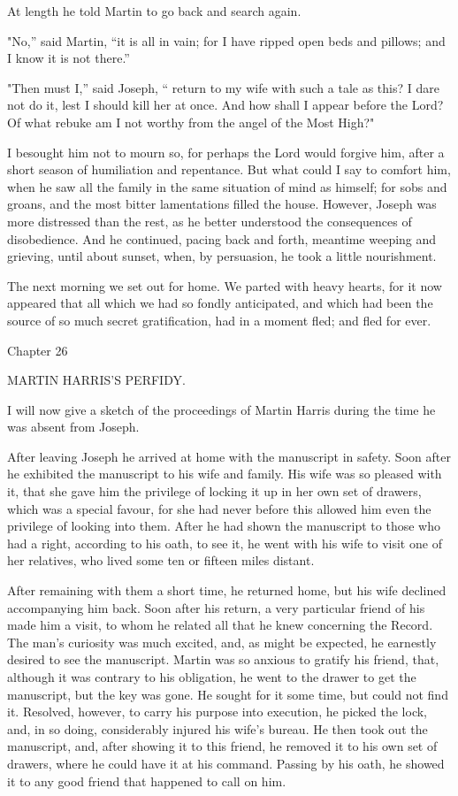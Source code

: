 		At length he told Martin to go back and search again.

		"No,'' said Martin, ``it is all in vain; for I have ripped open beds and pillows; and I know it is not there.''

		"Then must I,'' said Joseph, `` return to my wife with such a tale as this? I dare not do it, lest I should kill her at once. And how shall I appear before the Lord? Of what rebuke am I not worthy from the angel of the Most High?"

		I besought him not to mourn so, for perhaps the Lord would forgive him, after a short season of humiliation and repentance. But what could I say to comfort him, when he saw all the family in the same situation of mind as himself; for sobs and groans, and the most bitter lamentations filled the house. However, Joseph was more distressed than the rest, as he better understood the consequences of disobedience. And he continued, pacing back and forth, meantime weeping and grieving, until about sunset, when, by persuasion, he took a little nourishment.

		The next morning we set out for home. We parted with heavy hearts, for it now appeared that all which we had so fondly anticipated, and which had been the source of so much secret gratification, had in a moment fled; and fled for ever.
		
		Chapter 26

		MARTIN HARRIS'S PERFIDY.

		I will now give a sketch of the proceedings of Martin Harris during the time he was absent from Joseph.

		After leaving Joseph he arrived at home with the manuscript in safety. Soon after he exhibited the manuscript to his wife and family. His wife was so pleased with it, that she gave him the privilege of locking it up in her own set of drawers, which was a special favour, for she had never before this allowed him even the privilege of looking into them. After he had shown the manuscript to those who had a right, according to his oath, to see it, he went with his wife to visit one of her relatives, who lived some ten or fifteen miles distant.

		After remaining with them a short time, he returned home, but his wife declined accompanying him back. Soon after his return, a very particular friend of his made him a visit, to whom he related all that he knew concerning the Record. The man's curiosity was much excited, and, as might be expected, he earnestly desired to see the manuscript. Martin was so anxious to gratify his friend, that, although it was contrary to his obligation, he went to the drawer to get the manuscript, but the key was gone. He sought for it some time, but could not find it. Resolved, however, to carry his purpose into execution, he picked the lock, and, in so doing, considerably injured his wife's bureau. He then took out the manuscript, and, after showing it to this friend, he removed it to his own set of drawers, where he could have it at his command. Passing by his oath, he showed it to any good friend that happened to call on him.

